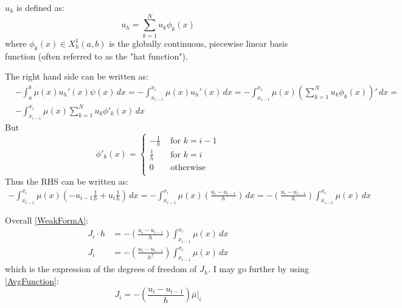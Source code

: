 \documentclass{article}
\begin{document}
$u_h$ is defined as:
\begin{equation}
    u_h = \sum_{k=1}^{N} u_k \phi_k(x)
    \label{eq:u_hDef}
\end{equation}
where $\phi_k(x) \in X_h^1(a,b)$ is the globally continuous, piecewise linear basis function (often referred to as the "hat function").

The right hand side can be written as:
\begin{align}
    & -\int_{a}^{b} \mu(x)u_h'(x) \psi(x) \, dx = -\int_{x_{i-1}}^{x_i} \mu(x)u_h'(x) \, dx =  -\int_{x_{i-1}}^{x_i} \mu(x) \left(\sum_{k=1}^{N} u_k \phi_k(x)\right)' \, dx = \\
    &  - \int_{x_{i-1}}^{x_i} \mu(x) \sum_{k=1}^{N} u_k \phi'_k(x) \, dx
\end{align}
 But 
\begin{equation}
\phi'_k(x) =
    \begin{cases}
           -\frac{1}{h} &\text{  for } k=i-1 \\
          
           \frac{1}{h} &\text{  for } k = i  \\
          
           0 &\text{ otherwise }  \\
    \end{cases}
\end{equation}
 Thus the RHS can be written as: 
 \begin{align}
    -\int_{x_{i-1}}^{x_i} \mu(x) \left(- u_{i-1} \frac{1}{h} + u_i \frac{1}{h} \right) \, dx = -\int_{x_{i-1}}^{x_i} \mu(x) \left(\frac{u_i - u_{i-1}}{h}  \right) \, dx= -\left(\frac{u_i - u_{i-1}}{h}  \right) \int_{x_{i-1}}^{x_i} \mu(x) \, dx
 \end{align}

Overall \eqref{WeakFormA}:
\begin{align}
    J_i \cdot h &= - \left(\frac{u_i - u_{i-1}}{h}  \right) \int_{x_{i-1}}^{x_i} \mu(x) \, dx \\
    J_i & = - \left(\frac{u_i - u_{i-1}}{h^2}  \right) \int_{x_{i-1}}^{x_i} \mu(x) \, dx
\end{align}
which is the expression of the degrees of freedom of $J_h$. I may go further by using \eqref{AvgFunction}:
\begin{equation}
    J_i  = - \left(\frac{u_i - u_{i-1}}{h}  \right)  \overline{\mu}|_i
    \label{eq:primflux}
\end{equation}
\end{document}
